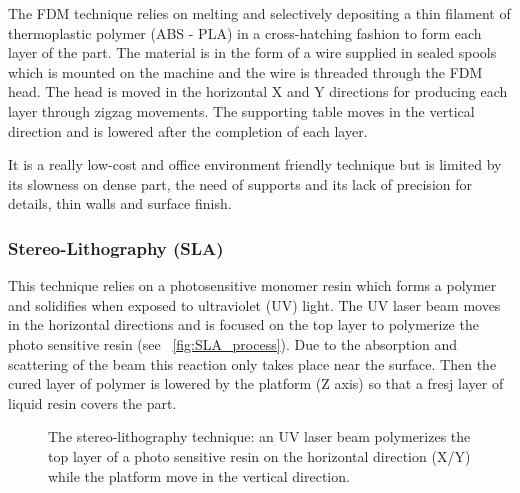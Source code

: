 The FDM technique relies on melting and selectively depositing a thin filament of thermoplastic polymer (ABS - PLA) in a cross-hatching fashion to form each layer of the part. The material is in the form of a wire supplied in sealed spools which is mounted on the machine and the wire is threaded through the FDM head. The head is moved in the horizontal X and Y directions for producing each layer through zigzag movements. The supporting table moves in the vertical direction and is lowered after the completion of each layer.

\begin{figure}[h]
    \centering
        \hfil
        \hfil
    \caption{}
    \label{fig:FDM_technique}
\end{figure}

It is a really low-cost and office environment friendly technique but is limited by its slowness on dense part, the need of supports and its lack of precision for details, thin walls and surface finish.


\subsubsection{Stereo-Lithography (SLA)} %

This technique relies on a photosensitive monomer resin which forms a polymer and solidifies when exposed to ultraviolet (UV) light. The UV laser beam moves in the horizontal directions and is focused on the top layer to polymerize the photo sensitive resin (see \figurename~\ref{fig:SLA_process}). Due to the absorption and scattering of the beam this reaction only takes place near the surface. Then the cured layer of polymer is lowered by the platform (Z axis) so that a fresj layer of liquid resin covers the part.

\begin{figure}[h]
    \centering
        \hfil
        \hfil
    \caption{The stereo-lithography technique: an UV laser beam polymerizes the top layer of a photo sensitive resin on the horizontal direction (X/Y) while the platform move in the vertical direction.}
    \label{fig:SLA_technique}
\end{figure}

